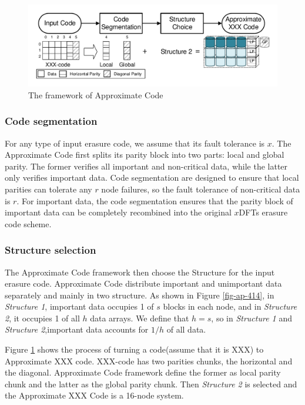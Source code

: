 \documentclass[sigconf]{acmart}
\begin{document}
\begin{figure}[]
\centering
\includegraphics[width=\linewidth]{photo/Framework.pdf}
\caption{The framework of Approximate Code}
\label{fig-framework}
\end{figure}

\subsubsection{Code segmentation}
For any type of input erasure code, we assume that its fault tolerance is $x$. The Approximate Code first splits its parity block into two parts: local and global parity. The former verifies all important and non-critical data, while the latter only verifies important data. Code segmentation are designed to ensure that local parities can tolerate any $r$ node failures, so the fault tolerance of non-critical data is $r$. For important data, the code segmentation ensures that the parity block of important data can be completely recombined into the original $x$DFTs erasure code scheme.

\subsubsection{Structure selection}
The Approximate Code framework then choose the Structure for the input erasure code.
Approximate Code distribute important and unimportant data separately and mainly in two structure. As shown in Figure \ref{fig-ap-414}, in \emph{Structure 1}, important data occupies 1 of $s$ blocks in each node, and in \emph{Structure 2}, it occupies 1 of all $h$ data arrays.
We define that $h=s$, so in \emph{Structure 1} and \emph{Structure 2},important data accounts for $1/h$ of all data.

Figure \ref{fig-framework} shows the process of turning a code(assume that it is XXX) to Approximate XXX code. XXX-code has two parities chunks, the horizontal and the diagonal. Approximate Code framework define the former as local parity chunk and the latter as the global parity chunk. Then \emph{Structure 2} is selected and the Approximate XXX Code is a 16-node system.
\end{document}
